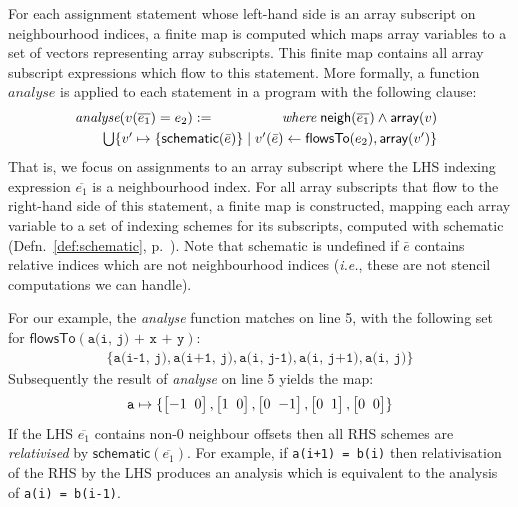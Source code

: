 \documentclass[9pt,preprint]{sigplanconf}
\theoremstyle{definition}
\newcommand{\ie}{\emph{i.e.}}
\newcommand{\neigh}{\textsf{neigh}}
\newcommand{\arrayTy}{\textsf{array}}
\newcommand{\vtwoh}[2]{\setlength{\arraycolsep}{0em}
\left[\begin{array}{cc}#1 \; & \; #2\end{array}\right]}
\begin{document}
For each assignment statement whose left-hand side is an array
subscript on neighbourhood indices, a finite map is computed which
maps array variables to a set of vectors representing array
subscripts.  This finite map contains all array subscript expressions
which flow to this statement. More formally, a function
$\textit{analyse}$ is applied to each statement in a program with the
following clause:
%
\begin{align*}
\hspace{-0.5em}
\begin{array}{lr}
\textit{analyse}(v(\overline{e_1}) = e_2)
 := \qquad\qquad & \textit{where} \; \neigh(\overline{e_1}) \wedge \arrayTy(v)  \\[0.3em]
\multicolumn{2}{l}{\qquad \bigcup\{v' \mapsto \{
\textsf{schematic}(\bar{e})\} \mid v'(\bar{e}) \leftarrow \mathsf{flowsTo}(e_2),
  \arrayTy(v')\}}
\end{array}
\end{align*}
%
That is, we focus on assignments to an array subscript where the LHS 
indexing expression $\overline{e_1}$ is a neighbourhood index.  For
all array subscripts that flow to the right-hand side of this
statement, a finite map is constructed, mapping each array variable
to a set of indexing schemes for its subscripts, computed
with \textsf{schematic} (Defn.~\ref{def:schematic},
p.~\pageref{def:schematic}).
 Note that \textsf{schematic} is undefined if
$\bar{e}$ contains relative indices which are not neighbourhood
indices (\ie{}, these are not stencil computations we can handle). 

For our example, the \textit{analyse} function matches on
line 5, with the following set for $\textsf{flowsTo}(\texttt{a(i, j) + x +
  y})$:
%
\begin{align*}
\{\texttt{a(i-1, j)}, \texttt{a(i+1, j)}, \texttt{a(i, j-1)},
  \texttt{a(i, j+1)}, \texttt{a(i, j)}\}
\end{align*}
Subsequently the result of \textit{analyse} on line 5 yields the map:
\begin{align*}
\texttt{a} \mapsto \{\vtwoh{-1}{0}, \vtwoh{1}{0},
          \vtwoh{0}{-1}, \vtwoh{0}{1}, \vtwoh{0}{0}\}
\end{align*}
%
If the LHS $\overline{e_1}$ contains non-$0$ neighbour offsets 
then all RHS schemes are \emph{relativised} by
$\textsf{schematic}(\overline{e_1})$. For example, 
if \texttt{a(i+1) = b(i)} then relativisation of the RHS by the LHS
produces an analysis which is equivalent to the analysis of \texttt{a(i) = b(i-1)}. 
\end{document}
